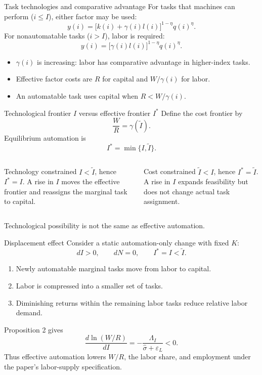 \documentclass[aspectratio=169,10pt]{beamer}
\newcommand{\Istar}{I^{*}}
\newcommand{\Itilde}{\widetilde I}
\newcommand{\sigHat}{\widehat\sigma}
\begin{document}
\begin{frame}{Task technologies and comparative advantage}
For tasks that machines can perform ($i\le I$), either factor may be used:
\[
  y(i)=\bigl[k(i)+\gamma(i)l(i)\bigr]^{1-\eta}q(i)^{\eta}.
\]
For nonautomatable tasks ($i>I$), labor is required:
\[
  y(i)=\bigl[\gamma(i)l(i)\bigr]^{1-\eta}q(i)^{\eta}.
\]
\begin{itemize}
  \item $\gamma(i)$ is increasing: labor has comparative advantage in
        higher-index tasks.
  \item Effective factor costs are $R$ for capital and $W/\gamma(i)$ for labor.
  \item An automatable task uses capital when $R<W/\gamma(i)$.
\end{itemize}
\end{frame}

\begin{frame}{Technological frontier $I$ versus effective frontier $\Istar$}
Define the cost frontier by
\[
  \frac{W}{R}=\gamma(\Itilde).
\]
Equilibrium automation is
\[
  \boxed{\Istar=\min\{I,\Itilde\}}.
\]
\begin{columns}[T]
\begin{block}{Technology constrained}
$I<\Itilde$, hence $\Istar=I$. A rise in $I$ moves the effective frontier and
reassigns the marginal task to capital.
\end{block}
\begin{block}{Cost constrained}
$\Itilde<I$, hence $\Istar=\Itilde$. A rise in $I$ expands feasibility but does
not change actual task assignment.
\end{block}
\end{columns}
\vspace{0.4em}
\alert{Technological possibility is not the same as effective automation.}
\end{frame}

\begin{frame}{Displacement effect}
Consider a static automation-only change with fixed $K$:
\[
  dI>0,\qquad dN=0,\qquad \Istar=I<\Itilde.
\]
\begin{enumerate}
  \item Newly automatable marginal tasks move from labor to capital.
  \item Labor is compressed into a smaller set of tasks.
  \item Diminishing returns within the remaining labor tasks reduce relative
        labor demand.
\end{enumerate}
Proposition 2 gives
\[
  \frac{d\ln(W/R)}{dI}
  =-\frac{\Lambda_I}{\sigHat+\varepsilon_L}<0.
\]
Thus effective automation lowers $W/R$, the labor share, and employment under
the paper's labor-supply specification.
\end{frame}
\end{document}
